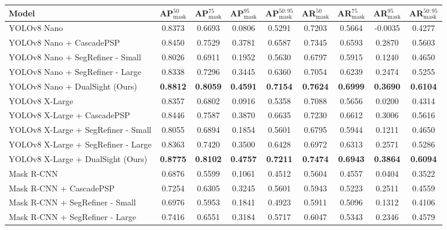 \begin{table*}[h!]
\centering
\begin{adjustbox}{width=\textwidth}
\begin{tabular}{@{}l|c|c|c|c|c|c|c|c@{}}
\toprule
\textbf{Model} & \textbf{AP$^{50}_{\text{mask}}$} & \textbf{AP$^{75}_{\text{mask}}$} & \textbf{AP$^{95}_{\text{mask}}$} & \textbf{AP$^{50:95}_{\text{mask}}$} & \textbf{AR$^{50}_{\text{mask}}$} & \textbf{AR$^{75}_{\text{mask}}$} & \textbf{AR$^{95}_{\text{mask}}$} & \textbf{AR$^{50:95}_{\text{mask}}$} \\ \midrule
YOLOv8 Nano & 0.8373 & 0.6693 & 0.0806 & 0.5291 & 0.7203 & 0.5664 & -0.0035 & 0.4277 \\
YOLOv8 Nano + CascadePSP & 0.8450 & 0.7529 & 0.3781 & 0.6587 & 0.7345 & 0.6593 & 0.2870 & 0.5603 \\
YOLOv8 Nano + SegRefiner - Small & 0.8026 & 0.6911 & 0.1952 & 0.5630 & 0.6797 & 0.5915 & 0.1240 & 0.4650 \\
YOLOv8 Nano + SegRefiner - Large & 0.8338 & 0.7296 & 0.3445 & 0.6360 & 0.7054 & 0.6239 & 0.2474 & 0.5255 \\
YOLOv8 Nano + DualSight (Ours) & \textbf{0.8812} & \textbf{0.8059} & \textbf{0.4591} & \textbf{0.7154} & \textbf{0.7624} & \textbf{0.6999} & \textbf{0.3690} & \textbf{0.6104} \\
\midrule
YOLOv8 X-Large & 0.8357 & 0.6802 & 0.0916 & 0.5358 & 0.7088 & 0.5656 & 0.0200 & 0.4314 \\
YOLOv8 X-Large + CascadePSP & 0.8446 & 0.7587 & 0.3870 & 0.6635 & 0.7230 & 0.6612 & 0.3006 & 0.5616 \\
YOLOv8 X-Large + SegRefiner - Small & 0.8055 & 0.6894 & 0.1854 & 0.5601 & 0.6795 & 0.5944 & 0.1211 & 0.4650 \\
YOLOv8 X-Large + SegRefiner - Large & 0.8363 & 0.7420 & 0.3500 & 0.6428 & 0.6972 & 0.6313 & 0.2571 & 0.5286 \\
YOLOv8 X-Large + DualSight (Ours) & \textbf{0.8775} & \textbf{0.8102} & \textbf{0.4757} & \textbf{0.7211} & \textbf{0.7474} & \textbf{0.6943} & \textbf{0.3864} & \textbf{0.6094} \\
\midrule
Mask R-CNN & 0.6876 & 0.5599 & 0.1061 & 0.4512 & 0.5604 & 0.4557 & 0.0404 & 0.3522 \\
Mask R-CNN + CascadePSP & 0.7254 & 0.6305 & 0.3245 & 0.5601 & 0.5943 & 0.5223 & 0.2511 & 0.4559 \\
Mask R-CNN + SegRefiner - Small & 0.6976 & 0.5953 & 0.1841 & 0.4923 & 0.5911 & 0.5096 & 0.1312 & 0.4106 \\
Mask R-CNN + SegRefiner - Large & 0.7416 & 0.6551 & 0.3184 & 0.5717 & 0.6047 & 0.5343 & 0.2346 & 0.4579 \\

\end{tabular}
\end{adjustbox}
\end{table*}
